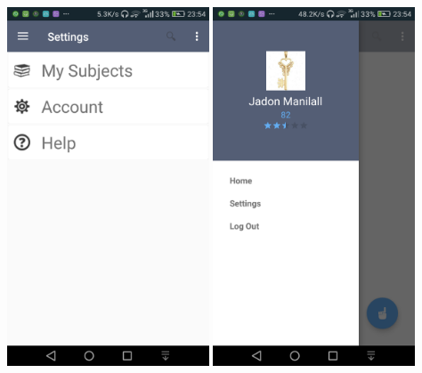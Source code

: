 \documentclass[12pt]{article}
\begin{document}
\begin{flushleft}
\includegraphics[width=60mm]{./Sprint3Models/Screenshot/settings.png}
\includegraphics[width=60mm]{./Sprint3Models/Screenshot/pulldown.png}
\end{flushleft}
\end{document}
